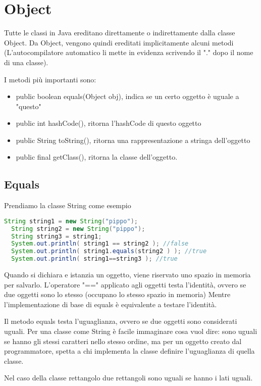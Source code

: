 \documentclass[a4paper,12pt,twoside]{book}
\begin{document}
\section{Object}

Tutte le classi in Java ereditano direttamente o indirettamente dalla
classe Object. Da Object, vengono quindi ereditati implicitamente
alcuni metodi (L'autocompilatore automatico li mette in evidenza
scrivendo il "." dopo il nome di una classe).

I metodi più importanti sono:
\begin{itemize}
\item public boolean equals(Object obj), indica se un certo oggetto è
  uguale a "questo"
\item public int hashCode(), ritorna l'hashCode di questo oggetto
\item public String toString(), ritorna una rappresentazione a stringa
  dell'oggetto
\item public final getClass(), ritorna la classe dell'oggetto.
\end{itemize}

\subsection{Equals} 
Prendiamo la classe String come esempio
\begin{lstlisting}[caption={Identità vs Uguaglianza},
  label={lst:Equals},language=Java]
  String string1 = new String("pippo");
  String string2 = new String("pippo");
  String string3 = string1;
  System.out.println( string1 == string2 ); //false
  System.out.println( string1.equals(string2 ) ); //true
  System.out.println( string1==string3 ); //true

\end{lstlisting}
Quando si dichiara e istanzia un oggetto, viene riservato uno spazio
in memoria per salvarlo. L'operatore "==" applicato agli oggetti testa
l'identità, ovvero se due oggetti sono lo stesso (occupano lo stesso
spazio in memoria) Mentre l'implementazione di base di equals è
equivalente a testare l'identità.

Il metodo equals testa l'uguaglianza, ovvero se due oggetti sono
considerati uguali. Per una classe come String è facile immaginare
cosa vuol dire: sono uguali se hanno gli stessi caratteri nello stesso
ordine, ma per un oggetto creato dal programmatore, spetta a chi
implementa la classe definire l'uguaglianza di quella classe.

Nel caso della classe rettangolo due rettangoli sono uguali se hanno i
lati uguali.
\end{document}
